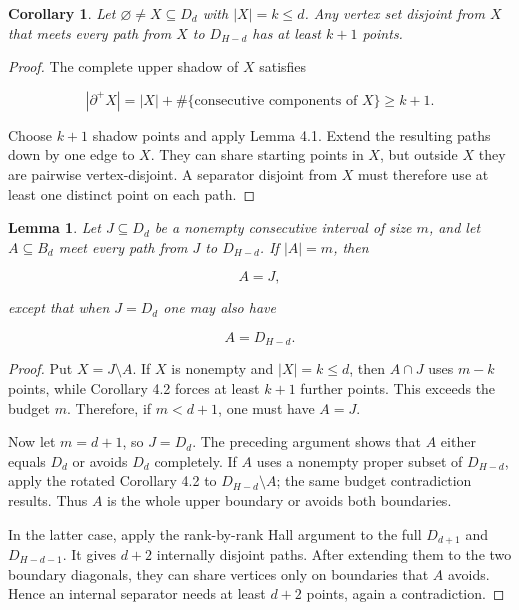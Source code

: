 \documentclass[11pt]{article}
\newtheorem{lemma}[theorem]{Lemma}
\newtheorem{corollary}[theorem]{Corollary}
\numberwithin{equation}{section}
\begin{document}
\Needspace{0.25\textheight}
\begin{corollary}

Let $\varnothing\ne X\subseteq D_d$ with $|X|=k\le d$. Any vertex set
disjoint from $X$ that meets every path from $X$ to $D_{H-d}$ has at least
$k+1$ points.

\end{corollary}

\begin{proof}

The complete upper shadow of $X$ satisfies

\nopagebreak[4]
\[
|\partial^+X|
=|X|+\#\{\text{consecutive components of }X\}
\ge k+1.
\]

Choose $k+1$ shadow points and apply Lemma 4.1. Extend the resulting paths
down by one edge to $X$. They can share starting points in $X$, but outside
$X$ they are pairwise vertex-disjoint. A separator disjoint from $X$ must
therefore use at least one distinct point on each path.
\end{proof}


\Needspace{0.25\textheight}
\begin{lemma}

Let $J\subseteq D_d$ be a nonempty consecutive interval of size $m$, and
let $A\subseteq B_d$ meet every path from $J$ to $D_{H-d}$. If $|A|=m$,
then

\nopagebreak[4]
\[
A=J,
\tag{4.1}
\]

except that when $J=D_d$ one may also have

\nopagebreak[4]
\[
A=D_{H-d}.
\tag{4.2}
\]

\end{lemma}

\begin{proof}

Put $X=J\setminus A$. If $X$ is nonempty and $|X|=k\le d$, then $A\cap J$
uses $m-k$ points, while Corollary 4.2 forces at least $k+1$ further points.
This exceeds the budget $m$. Therefore, if $m<d+1$, one must have $A=J$.

Now let $m=d+1$, so $J=D_d$. The preceding argument shows that $A$ either
equals $D_d$ or avoids $D_d$ completely. If $A$ uses a nonempty proper
subset of $D_{H-d}$, apply the rotated Corollary 4.2 to
$D_{H-d}\setminus A$; the same budget contradiction results. Thus $A$ is
the whole upper boundary or avoids both boundaries.

In the latter case, apply the rank-by-rank Hall argument to the full
$D_{d+1}$ and $D_{H-d-1}$. It gives $d+2$ internally disjoint paths. After
extending them to the two boundary diagonals, they can share vertices only
on boundaries that $A$ avoids. Hence an internal separator needs at least
$d+2$ points, again a contradiction.
\end{proof}
\end{document}
